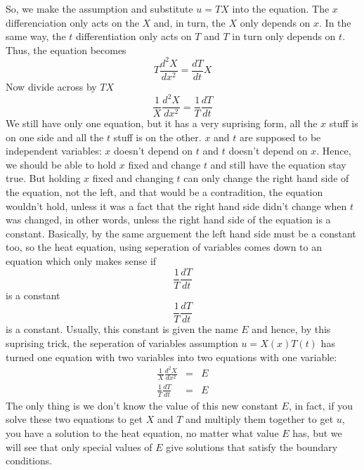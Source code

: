 \documentclass[12pt]{article}
\begin{document}
{\begin{enumerate}
So, we make the assumption and substitute $u=TX$ into the equation. The $x$ differenciation only acts on the $X$ and, in turn, the $X$ only depends on $x$. In the same way, the $t$ differentiation only acts on $T$ and $T$ in turn only depends on $t$. Thus, the equation becomes
\begin{equation}
T\frac{d^2 X}{d x^2}=\frac{d T}{dt}X
\end{equation}
Now divide across by $TX$
\begin{equation}
\frac{1}{X}\frac{d^2 X}{d x^2}=\frac{1}{T}\frac{d T}{dt}
\end{equation}
We still have only one equation, but it has a very suprising form, all
the $x$ stuff is on one side and all the $t$ stuff is on the
other. $x$ and $t$ are supposed to be independent variables: $x$
doesn't depend on $t$ and $t$ doesn't depend on $x$. Hence, we should
be able to hold $x$ fixed and change $t$ and still have the equation
stay true. But holding $x$ fixed and changing $t$ can only change the
right hand side of the equation, not the left, and that would be a
contradition, the equation wouldn't hold, unless it was a fact that
the right hand side didn't change when $t$ was changed, in other
words, unless the right hand side of the equation is a
constant. Basically, by the same arguement the left hand side must be
a constant too, so the heat equation, using seperation of variables
comes down to an equation which only makes sense if
\begin{equation}
\frac{1}{T}\frac{d T}{dt}
\end{equation}
is a constant
\begin{equation}
\frac{1}{T}\frac{d T}{dt}
\end{equation}
is a constant. Usually, this constant is given the name $E$ and hence,
by this suprising trick, the seperation of variables assumption
$u=X(x)T(t)$ has turned one equation with two variables into two
equations with one variable:
\begin{eqnarray}
\frac{1}{X}\frac{d^2 X}{d x^2}&=&E\nonumber\\
\frac{1}{T}\frac{d T}{d t}&=&E
\end{eqnarray}
The only thing is we don't know the value of this new constant $E$, in
fact, if you solve these two equations to get $X$ and $T$ and multiply
them together to get $u$, you have a solution to the heat equation, no
matter what value $E$ has, but we will see that only special values of
$E$ give solutions that satisfy the boundary conditions.


\end{enumerate}}
\end{document}
